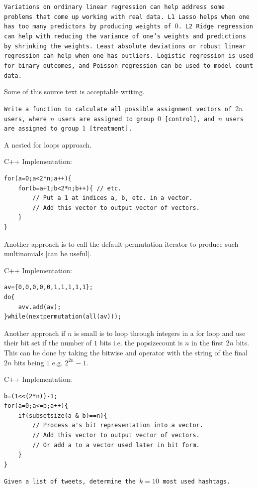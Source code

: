 \texttt{Variations on ordinary linear regression can help address some problems that come up working with real data. L1 Lasso helps when one has too many predictors by producing weights of $0$. L2 Ridge regression can help with reducing the variance of one's weights and predictions by shrinking the weights. Least absolute deviations or robust linear regression can help when one has outliers. Logistic regression is used for binary outcomes, and Poisson regression can be used to model count data.}

Some of this source text is acceptable writing.

\texttt{Write a function to calculate all possible assignment vectors of $2n$ users, where $n$ users are assigned to group $0$ [control], and $n$ users are assigned to group $1$ [treatment].}

A nested for loops approach.

C++ Implementation:

\begin{verbatim}
for(a=0;a<2*n;a++){
    for(b=a+1;b<2*n;b++){ // etc.
        // Put a 1 at indices a, b, etc. in a vector.
        // Add this vector to output vector of vectors.
    }
}
\end{verbatim}

Another approach is to call the default permutation iterator to produce such multinomials [can be useful].

C++ Implementation:

\begin{verbatim}
av={0,0,0,0,0,1,1,1,1,1};
do{
    avv.add(av);
}while(nextpermutation(all(av)));
\end{verbatim}

Another approach if $n$ is small is to loop through integers in a for loop and use their bit set if the number of $1$ bits i.e. the popsizecount is $n$ in the first $2n$ bits. This can be done by taking the bitwise and operator with the string of the final $2n$ bits being $1$ e.g. $2^{2n}-1$.

C++ Implementation:

\begin{verbatim}
b=(1<<(2*n))-1;
for(a=0;a<=b;a++){
    if(subsetsize(a & b)==n){
        // Process a's bit representation into a vector.
        // Add this vector to output vector of vectors.
        // Or add a to a vector used later in bit form.
    }
}
\end{verbatim}

\texttt{Given a list of tweets, determine the $k=10$ most used hashtags.}

